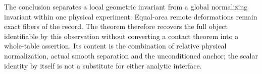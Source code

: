 The conclusion separates a local geometric invariant from a global
normalizing invariant within one physical experiment.  Equal-area
remote deformations remain exact fibers of the record.  The theorem
therefore recovers the full object identifiable by this observation
without converting a contact theorem into a whole-table assertion.
Its content is the combination of relative physical normalization,
actual smooth separation and the unconditioned anchor; the scalar
identity by itself is not a substitute for either analytic interface.
